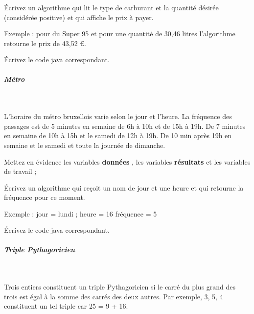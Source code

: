 \documentclass[11pt,a4paper]{article}
\begin{document}
          \'Ecrivez un algorithme qui lit le type de carburant et la quantit\'e d\'esir\'ee (consid\'er\'ee positive) et qui affiche le prix \`a payer.\par
				
          Exemple : pour du Super 95 et pour une quantit\'e de 30,46 litres l'algorithme retourne le prix de 43,52 €.
        
            \par
        \'Ecrivez le code java correspondant.
            \par
        
			
		\subparagraph{M\'etro} 
		
					\textcolor{white}{.} \par
				
          L'horaire du m\'etro bruxellois varie selon le jour et l'heure. La fr\'equence des passages est de 5
          minutes en semaine de 6h \`a 10h et de 15h \`a 19h. De 7 minutes en semaine de 10h \`a 15h et le
          samedi de 12h \`a 19h. De 10 min apr\`es 19h en semaine et le samedi et toute la journ\'ee de
          dimanche. 
        
            \par
        
          Mettez en \'evidence les variables \textbf{\guillemotleft  donn\'ees \guillemotright }, 
          les variables \textbf{\guillemotleft  r\'esultats \guillemotright } et les variables de travail ;
        
            \par
        
          \'Ecrivez un algorithme qui re\c coit un nom de jour et une heure et qui retourne la fr\'equence pour ce moment. \par
				
          Exemple : jour = \guillemotleft  lundi \guillemotright  ; heure = 16 fr\'equence = 5
        
            \par
        \'Ecrivez le code java correspondant.
            \par
        
			
		\subparagraph{Triple Pythagoricien} 
		
					\textcolor{white}{.} \par
				
          Trois entiers constituent un triple Pythagoricien si le carr\'e du plus grand des trois est \'egal \`a la somme des carr\'es des deux autres. 
          Par exemple, 3, 5, 4 constituent un tel triple car 25 = 9 + 16.
        
\end{document}
